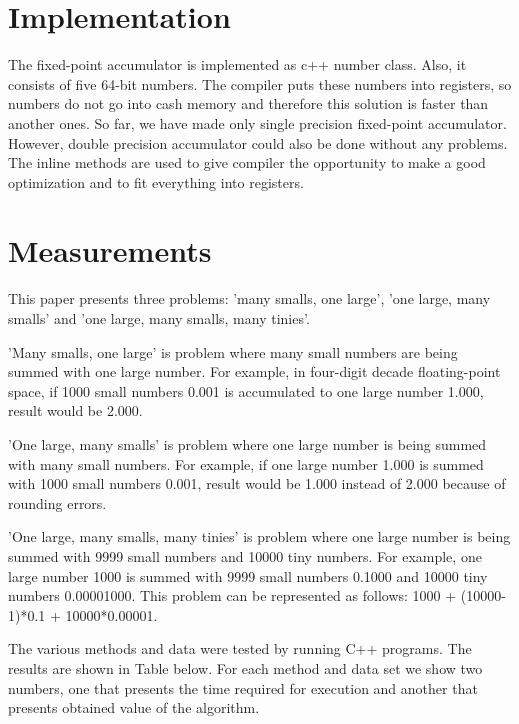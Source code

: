 \documentclass[conference]{IEEEtran}
\begin{document}
\section{Implementation}
The fixed-point accumulator is implemented as c++ number class.
Also, it consists of five 64-bit numbers. The compiler puts these 
numbers into registers, so numbers do not go into cash
memory and therefore this solution is faster than another ones.
So far, we have made only single precision fixed-point 
accumulator. However, double precision accumulator could also 
be done without any problems. The inline methods are used to give compiler
the opportunity to make a good optimization and to fit
everything into registers.


\section{Measurements} 
This paper presents three problems: 'many smalls, one large',
'one large, many smalls' and 'one large, many smalls, many tinies'.
\par
'Many smalls, one large' is problem where many small numbers 
are being summed with one large number. For example, 
in four-digit decade floating-point space, if 1000 small 
numbers 0.001 is accumulated to one large 
number 1.000, result would be 2.000. 
\par 
'One large, many smalls' is problem where one large number 
is being summed with many small numbers. For example, 
if one large number 1.000 is summed with 1000 small 
numbers 0.001, result would be 1.000 instead of 2.000 
because of rounding errors.
\par 
'One large, many smalls, many tinies' is problem where one 
large number is being summed with 9999 small numbers and
10000 tiny numbers. For example, one large number 1000 is 
summed with 9999 small numbers 0.1000 and 10000 tiny 
numbers 0.00001000. This problem can be represented 
as follows: 1000 + (10000-1)*0.1 + 10000*0.00001.
\par
The various methods and data were tested by running C++ programs.
The results are shown in Table below. For each method and data 
set we show two numbers, one that presents the time required for 
execution and another that presents obtained value of the algorithm.
\end{document}

